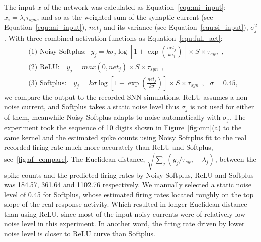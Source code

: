 	The input $x$ of the network was calculated as Equation~\ref{equ:mi_input}: $x_i=\lambda_i\tau_{syn}$, and so as the weighted sum of the synaptic current (see Equation~\ref{equ:mi_input}), $net_j$ and its variance (see Equation~\ref{equ:si_input}), $\sigma^2_j$.
	With three combined activation functions as Equation~\ref{equ:full_act}:
	\begin{equation}
	\begin{aligned}
	&\textrm{(1) Noisy Softplus:~~}  y_j=k \sigma_j \log [1 + \exp(\frac{net_j}{k \sigma_j})] \times S \times \tau_{syn}~~,  \\
	&\textrm{(2) ReLU:~~ } y_j=max(0, net_j) \times S \times \tau_{syn}~~, \\
	&\textrm{(3) Softplus:~~ } y_j=k \sigma \log [1 + \exp(\frac{net_j}{k \sigma})] \times S \times \tau_{syn}~~, ~~~\sigma=0.45,  
 	\end{aligned}
	\end{equation}	
	we compare the output to the recorded SNN simulations.
	ReLU assumes a non-noise current, and Softplus takes a static noise level thus $\sigma_j$ is not used for either of them, meanwhile Noisy Softplus adapts to noise automatically with $\sigma_j$.
	The experiment took the sequence of 10 digits shown in Figure~\ref{fig:cnn}(a) to the same kernel and the estimated spike counts using Noisy Softplus fit to the real recorded firing rate much more accurately than ReLU and Softplus,  see~\ref{fig:af_compare}.
	The Euclidean distance, $\sqrt{\sum_{j}(y_j/\tau_{syn} - \lambda_j)}$, between the spike counts and the predicted firing rates by Noisy Softplus, ReLU and Softplus was 184.57, 361.64 and 1102.76 respectively.
	We manually selected a static noise level of 0.45 for Softplus, whose estimated firing rates located roughly on the top slope of the real response activity.
	Which resulted in longer Euclidean distance than using ReLU, since most of the input noisy currents were of relatively low noise level in this experiment.
	In another word, the firing rate driven by lower noise level is closer to ReLU curve than Softplus.
	

